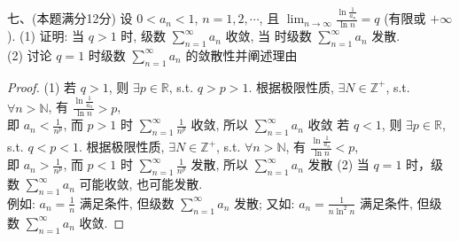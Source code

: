 \documentclass[11pt,twoside]{article} %
\begin{document}
\newpage
七、(本题满分12分)\;
设 $0<a_n<1$, $n=1,2,\cdots$, 且 $\lim_{n\to\infty}\frac{\ln\frac{1}{a_n}}{\ln n}=q$ (有限或 $+\infty$).\newline
(1) 证明: 当 $q>1$ 时, 级数 $\sum\limits_{n=1}^{\infty}a_n$ 收敛, 当   时级数 $\sum\limits_{n=1}^{\infty}a_n$ 发散.\\
(2) 讨论 $q=1$ 时级数 $\sum\limits_{n=1}^{\infty}a_n$ 的敛散性并阐述理由
\begin{proof}
(1) 若 $q>1$, 则 $\exists p\in\mathbb{R}$, s.t. $q>p>1$. 根据极限性质, $\exists N\in\mathbb{Z}^+$, s.t. $\forall n>\mathbb{N}$, 有 $\frac{\ln\frac{1}{a_n}}{\ln n}>p$,\\
即 $a_n<\frac{1}{n^p}$, 而 $p>1$ 时 $\sum\limits_{n=1}^{\infty}\frac{1}{n^p}$ 收敛, 所以 $\sum\limits_{n=1}^{\infty}a_n$ 收敛
若 $q<1$, 则 $\exists p\in\mathbb{R}$, s.t. $q<p<1$. 根据极限性质, $\exists N\in\mathbb{Z}^+$, s.t. $\forall n>\mathbb{N}$, 有 $\frac{\ln\frac{1}{a_n}}{\ln n}<p$,\\
即 $a_n>\frac{1}{n^p}$, 而 $p<1$ 时 $\sum\limits_{n=1}^{\infty}\frac{1}{n^p}$ 发散, 所以 $\sum\limits_{n=1}^{\infty}a_n$ 发散
(2) 当 $q=1$ 时，级数 $\sum\limits_{n=1}^{\infty}a_n$ 可能收敛, 也可能发散.\\
例如: $a_n=\frac{1}{n}$ 满足条件, 但级数 $\sum\limits_{n=1}^{\infty}a_n$ 发散;
又如: $a_n=\frac{1}{n\ln^2n}$ 满足条件, 但级数 $\sum\limits_{n=1}^{\infty}a_n$ 收敛.
\end{proof}


\clearpage
\end{document}
